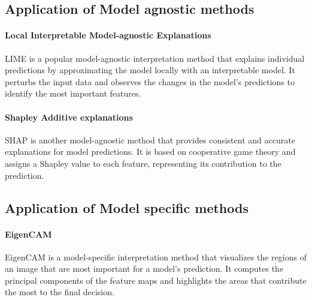 

\subsection{Application of Model agnostic methods}\label{subsec:Application-model-agnostic-methods}

\paragraph{Local Interpretable Model-agnostic Explanations}\label{par:lime}
LIME is a popular model-agnostic interpretation method that explains individual predictions by
approximating the model locally with an interpretable model.
It perturbs the input data and observes the changes in the model's predictions to identify the most
important features.

\paragraph{Shapley Additive explanations}\label{par:shap}
SHAP is another model-agnostic method that provides consistent and accurate explanations for model predictions.
It is based on cooperative game theory and assigns a Shapley value to each feature,
representing its contribution to the prediction.

\subsection{Application of Model specific methods}\label{subsec:application-model-specific-methods}

\paragraph{EigenCAM}\label{par:eigencam}
EigenCAM is a model-specific interpretation method that visualizes the regions of an image that are most
important for a model's prediction.
It computes the principal components of the feature maps and highlights the areas that contribute the most
to the final decision.

